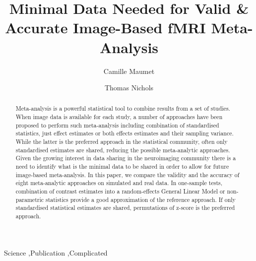 \documentclass[preprint]{elsarticle}
\begin{document}
\begin{frontmatter}


\title{Minimal Data Needed for Valid \& Accurate Image-Based fMRI Meta-Analysis}




\author{Camille Maumet}
\author{Thomas Nichols}

\address{WMG, University of Warwick, Coventry, UK}
\address{Statistics Department, University of Warwick, Coventry, UK.}

\begin{abstract}
Meta-analysis is a powerful statistical tool to combine results from a set of studies. When image data is available for each study, a number of approaches have been proposed to perform such meta-analysis including combination of standardised statistics, just effect estimates or both effects estimates and their sampling variance. While the latter is the preferred approach in the statistical community, often only standardised estimates are shared, reducing the possible meta-analytic approaches. Given the growing interest in data sharing in the neuroimaging community there is a need to identify what is the minimal data to be shared in order to allow for future image-based meta-analysis. In this paper, we compare the validity and the accuracy of eight meta-analytic approaches on simulated and real data. In one-sample tests, combination of contrast estimates into a random-effects General Linear Model or non-parametric statistics provide a good approximation of the reference approach. If only standardised statistical estimates are shared, permutations of z-score is the preferred approach.
\end{abstract}

\begin{keyword}
Science \sep Publication \sep Complicated


\end{keyword}

\end{frontmatter}
\end{document}

